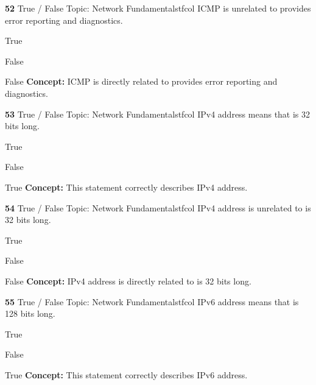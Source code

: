 \documentclass[10pt,a4paper]{article}
\begin{document}
\begin{qcard}{\color{white}\textbf{52} \hfill \small True / False \textbar{} Topic: Network Fundamentals}{tfcol}
ICMP is unrelated to provides error reporting and diagnostics.

\begin{qoptions}
\item True
\item False
\end{qoptions}
\begin{explainbox}{False}
\textbf{Concept:} ICMP is directly related to provides error reporting and diagnostics.
\end{explainbox}
\end{qcard}

\begin{qcard}{\color{white}\textbf{53} \hfill \small True / False \textbar{} Topic: Network Fundamentals}{tfcol}
IPv4 address means that is 32 bits long.

\begin{qoptions}
\item True
\item False
\end{qoptions}
\begin{explainbox}{True}
\textbf{Concept:} This statement correctly describes IPv4 address.
\end{explainbox}
\end{qcard}

\begin{qcard}{\color{white}\textbf{54} \hfill \small True / False \textbar{} Topic: Network Fundamentals}{tfcol}
IPv4 address is unrelated to is 32 bits long.

\begin{qoptions}
\item True
\item False
\end{qoptions}
\begin{explainbox}{False}
\textbf{Concept:} IPv4 address is directly related to is 32 bits long.
\end{explainbox}
\end{qcard}

\begin{qcard}{\color{white}\textbf{55} \hfill \small True / False \textbar{} Topic: Network Fundamentals}{tfcol}
IPv6 address means that is 128 bits long.

\begin{qoptions}
\item True
\item False
\end{qoptions}
\begin{explainbox}{True}
\textbf{Concept:} This statement correctly describes IPv6 address.
\end{explainbox}
\end{qcard}
\end{document}
